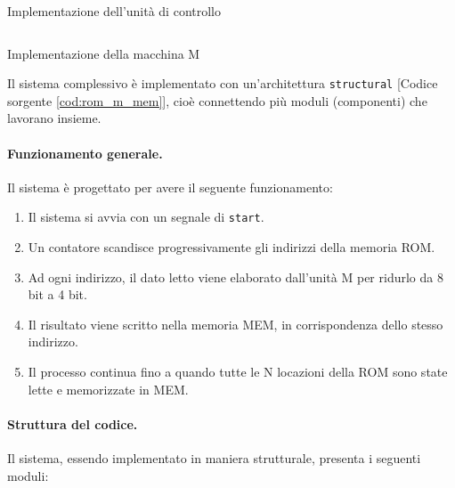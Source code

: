 \begin{code}
    \inputminted{vhdl}{vhdl/rom_m_mem_control_unit.vhd}
    \caption{Implementazione dell'unità di controllo}
    \label{cod:rom_m_mem_control_unit}
\end{code}

\begin{code}
    \inputminted{vhdl}{vhdl/rom_m_mem_M.vhd}
    \caption{Implementazione della macchina M}
    \label{cod:rom_m_mem_M}
\end{code}

Il sistema complessivo è implementato con un’architettura \texttt{structural} [Codice sorgente \ref{cod:rom_m_mem}], cioè connettendo più moduli (componenti) che lavorano insieme.
\paragraph{Funzionamento generale.}
Il sistema è progettato per avere il seguente funzionamento:

\begin{enumerate}
    \item Il sistema si avvia con un segnale di \texttt{start}.
    \item Un contatore scandisce progressivamente gli indirizzi della memoria ROM.
    \item Ad ogni indirizzo, il dato letto viene elaborato dall’unità M per ridurlo da 8 bit a 4 bit.
    \item Il risultato viene scritto nella memoria MEM, in corrispondenza dello stesso indirizzo.
    \item Il processo continua fino a quando tutte le N locazioni della ROM sono state lette e memorizzate in MEM.
\end{enumerate}

\paragraph{Struttura del codice.}
Il sistema, essendo implementato in maniera strutturale, presenta i seguenti moduli:

